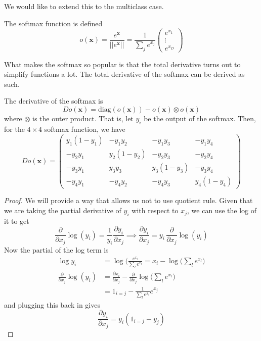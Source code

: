 \documentclass{article}
\begin{document}
  We would like to extend this to the multiclass case. 

  \begin{definition}
    The softmax function is defined 
    \begin{equation}
      o(\mathbf{x}) = \frac{e^{\mathbf{x}}}{||e^{\mathbf{x}}||} = \frac{1}{\sum_j e^{x_j}}\begin{pmatrix} e^{x_1} \\ \vdots \\ e^{x_D} \end{pmatrix}
    \end{equation}
  \end{definition}

  What makes the softmax so popular is that the total derivative turns out to simplify functions a lot. The total derivative of the softmax can be derived as such. 

  \begin{lemma}
    The derivative of the softmax is 
    \begin{equation}
      D o (\mathbf{x}) = \mathrm{diag}(o (\mathbf{x})) - o (\mathbf{x}) \otimes o (\mathbf{x})
    \end{equation}
    where $\otimes$ is the outer product. That is, let $y_i$ be the output of the softmax. Then, for the $4 \times 4$ softmax function, we have 
    \begin{equation}
      D o(\mathbf{x}) = \begin{pmatrix} y_1 (1 - y_1) & - y_1 y_2 & -y_1 y_3 & - y_1 y_4 \\ -y_2 y_1 & y_2 (1 - y_2) & - y_2 y_3 & - y_2 y_4 \\ -y_3 y_1 & y_3 y_3 & y_3 (1 - y_3) & -y_3 y_4 \\ -y_4 y_1 & -y_4 y_2 & -y_4 y_3 & y_4 (1 - y_4) \end{pmatrix}
    \end{equation}
  \end{lemma}
  \begin{proof}
    We will provide a way that allows us not to use quotient rule. Given that we are taking the partial derivative of $y_i$ with respect to $x_j$, we can use the log of it to get 
    \[\frac{\partial}{\partial x_j} \log (y_i) = \frac{1}{y_i} \frac{\partial y_i}{\partial x_j} \implies \frac{\partial y_i}{\partial x_j} = y_i \, \frac{\partial}{\partial x_j} \log(y_i)\]
    Now the partial of the log term is 
    \begin{align}
      \log{y_i} & = \log \bigg( \frac{e^{x_i}}{\sum_l e^{x_l}} = x_i - \log \bigg( \sum_l e^{x_l}\bigg) \\
      \frac{\partial}{\partial x_j} \log(y_i) & = \frac{\partial x_i}{\partial x_j} - \frac{\partial}{\partial x_j} \log \bigg( \sum_l e^{x_l}\bigg) \\
      & = 1_{i = j} - \frac{1}{\sum_l e^{x_l}} e^{x_j}
    \end{align}
    and plugging this back in gives 
    \begin{equation}
      \frac{\partial y_i}{\partial x_j} = y_i (1_{i = j} - y_j)
    \end{equation}
  \end{proof}
\end{document}
